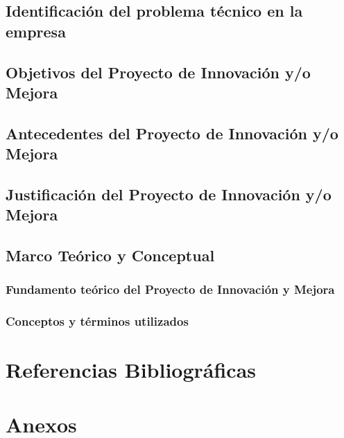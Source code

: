 \documentclass[stu, 12pt,letterpaper,donotrepeattitle,floatsintext,natbib]{apa7}
\begin{document}
	\subsection{Identificación del problema técnico en la empresa}
	\subsection{Objetivos del Proyecto de Innovación y/o Mejora}
	\subsection{Antecedentes del Proyecto de Innovación y/o Mejora}
	\subsection{Justificación del Proyecto de Innovación y/o Mejora}
	\subsection{Marco Teórico y Conceptual}
	\subsubsection{Fundamento teórico del Proyecto de Innovación y Mejora}
	\subsubsection{Conceptos y términos utilizados}
	
	
	
	\section{Referencias Bibliográficas}
	
	\section{Anexos}
	
\end{document}
